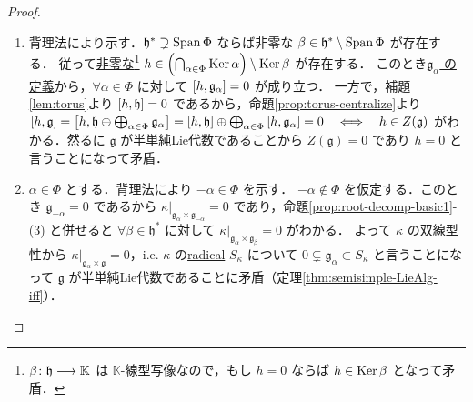 \documentclass[rep_main]{subfiles}
\begin{document}
\begin{proof}
	\begin{enumerate}
		\item 背理法により示す．$\mathfrak{h}^* \supsetneq \operatorname{Span} \Phi$ ならば非零な $\beta \in \mathfrak{h}^* \setminus \operatorname{Span} \Phi$ が存在する．
		従って\underline{非零な}\footnote{$\beta \colon \mathfrak{h} \longrightarrow \mathbb{K}$ は $\mathbb{K}$-線型写像なので，もし $h = 0$ ならば $h \in \operatorname{Ker} \beta$ となって矛盾．} $h \in \Bigl(\bigcap_{\alpha \in \Phi} \operatorname{Ker} \alpha \Bigr)\setminus \operatorname{Ker} \beta$ が存在する．
		このとき\hyperref[def:ga]{$\mathfrak{g}_\alpha$ の定義}から，$\forall \alpha \in \Phi$ に対して $\comm{h}{\mathfrak{g}_\alpha} = 0$ が成り立つ．
		一方で，補題\ref{lem:torus}より $\comm{h}{\mathfrak{h}} = 0$ であるから，命題\ref{prop:torus-centralize}より $\comm{h}{\mathfrak{g}} = \comm{h}{\mathfrak{h} \oplus \bigoplus_{\alpha \in \Phi} \mathfrak{g}_\alpha} = \comm{h}{\mathfrak{h}} \oplus \bigoplus_{\alpha \in \Phi} \comm{h}{\mathfrak{g}_\alpha} = 0 \IFF h \in Z(\mathfrak{g})$ がわかる．然るに $\mathfrak{g}$ が\hyperref[def:semisimple-LieAlg]{半単純Lie代数}であることから $Z(\mathfrak{g}) = 0$ であり $h = 0$ と言うことになって矛盾．

		\item $\alpha \in \Phi$ とする．背理法により $-\alpha \in \Phi$ を示す．
		$-\alpha \notin \Phi$ を仮定する．このとき $\mathfrak{g}_{-\alpha} = 0$ であるから $\kappa|_{\mathfrak{g}_\alpha \times \mathfrak{g}_{-\alpha}} = 0$ であり，命題\ref{prop:root-decomp-basic1}-(3) と併せると $\forall \beta \in \mathfrak{h}^*$ に対して $\kappa|_{\mathfrak{g}_\alpha \times \mathfrak{g}_\beta} = 0$ がわかる．
		よって $\kappa$ の双線型性から $\kappa|_{\mathfrak{g}_\alpha \times \mathfrak{g}} = 0$，i.e. $\kappa$ の\hyperref[def:radical-bilinear]{radical} $S_\kappa$ について $0 \subsetneq \mathfrak{g}_\alpha \subset S_\kappa$ と言うことになって $\mathfrak{g}$ が半単純Lie代数であることに矛盾（定理\ref{thm:semisimple-LieAlg-iff}）．


\end{enumerate}
\end{proof}
\end{document}
